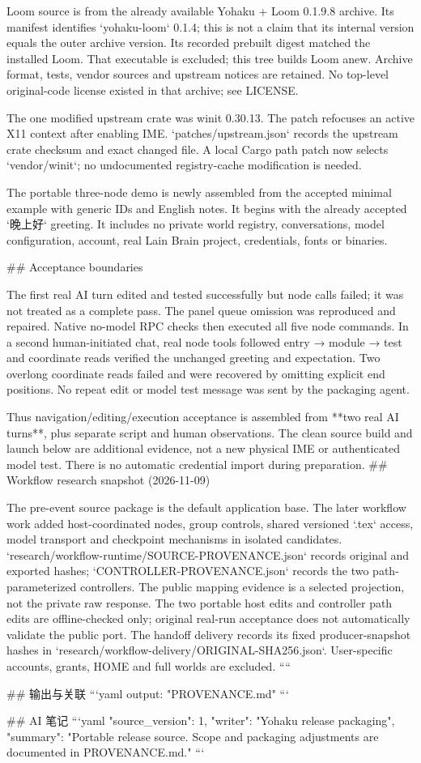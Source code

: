 Loom source is from the already available Yohaku + Loom 0.1.9.8 archive.
Its manifest identifies `yohaku-loom` 0.1.4; this is not a claim that its internal
version equals the outer archive version. Its recorded prebuilt digest matched
the installed Loom. That executable is excluded; this tree builds Loom anew.
Archive format, tests, vendor sources and upstream notices are retained.
No top-level original-code license existed in that archive; see LICENSE.

The one modified upstream crate was winit 0.30.13. The patch refocuses an active
X11 context after enabling IME. `patches/upstream.json` records the upstream
crate checksum and exact changed file. A local Cargo path patch now selects
`vendor/winit`; no undocumented registry-cache modification is needed.

The portable three-node demo is newly assembled from the accepted minimal
example with generic IDs and English notes. It begins with the already accepted
`晚上好` greeting. It includes no private world registry, conversations, model
configuration, account, real Lain Brain project, credentials, fonts or binaries.

## Acceptance boundaries

The first real AI turn edited and tested successfully but node calls failed;
it was not treated as a complete pass. The panel queue omission was reproduced
and repaired. Native no-model RPC checks then executed all five node commands.
In a second human-initiated chat, real node tools followed entry → module → test
and coordinate reads verified the unchanged greeting and expectation. Two
overlong coordinate reads failed and were recovered by omitting explicit end
positions. No repeat edit or model test message was sent by the packaging agent.

Thus navigation/editing/execution acceptance is assembled from **two real AI
turns**, plus separate script and human observations. The clean source build
and launch below are additional evidence, not a new physical IME or authenticated
model test. There is no automatic credential import during preparation.
## Workflow research snapshot (2026-11-09)

The pre-event source package is the default application base. The later workflow work added host-coordinated nodes, group controls, shared versioned `.tex` access, model transport and checkpoint mechanisms in isolated candidates. `research/workflow-runtime/SOURCE-PROVENANCE.json` records original and exported hashes; `CONTROLLER-PROVENANCE.json` records the two path-parameterized controllers. The public mapping evidence is a selected projection, not the private raw response. The two portable host edits and controller path edits are offline-checked only; original real-run acceptance does not automatically validate the public port. The handoff delivery records its fixed producer-snapshot hashes in `research/workflow-delivery/ORIGINAL-SHA256.json`. User-specific accounts, grants, HOME and full worlds are excluded.
````

## 输出与关联
```yaml
output: "PROVENANCE.md"
```

## AI 笔记
```yaml
{"source_version": 1, "writer": "Yohaku release packaging", "summary": "Portable release source. Scope and packaging adjustments are documented in PROVENANCE.md."}
```

